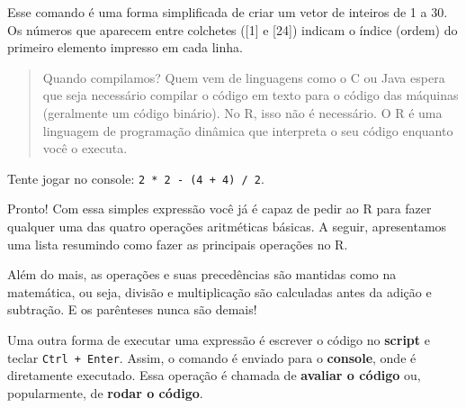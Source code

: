 \documentclass[]{book}
\newenvironment{Shaded}{\begin{snugshade}}{\end{snugshade}}
\newcommand{\CommentTok}[1]{\textcolor[rgb]{0.56,0.35,0.01}{\textit{#1}}}
\newcommand{\DecValTok}[1]{\textcolor[rgb]{0.00,0.00,0.81}{#1}}
\newcommand{\OperatorTok}[1]{\textcolor[rgb]{0.81,0.36,0.00}{\textbf{#1}}}
\newcommand{\StringTok}[1]{\textcolor[rgb]{0.31,0.60,0.02}{#1}}
\begin{document}
Esse comando é uma forma simplificada de criar um vetor de inteiros de 1 a 30.
Os números que aparecem entre colchetes ({[}1{]} e {[}24{]}) indicam o índice (ordem) do primeiro elemento impresso em cada linha.

\begin{quote}
Quando compilamos? Quem vem de linguagens como o C ou Java espera que seja necessário compilar o código em texto para o código das máquinas (geralmente um código binário). No R, isso não é necessário. O R é uma linguagem de programação dinâmica que interpreta o seu código enquanto você o executa.
\end{quote}

Tente jogar no console: \texttt{2\ *\ 2\ -\ (4\ +\ 4)\ /\ 2}.

Pronto! Com essa simples expressão você já é capaz de pedir ao R para fazer qualquer uma das quatro operações aritméticas básicas. A seguir, apresentamos uma lista resumindo como fazer as principais operações no R.

\begin{Shaded}
\end{Shaded}

Além do mais, as operações e suas precedências são mantidas como na matemática, ou seja, divisão e multiplicação são calculadas antes da adição e subtração. E os parênteses nunca são demais!

Uma outra forma de executar uma expressão é escrever o código no \textbf{script} e teclar \texttt{Ctrl\ +\ Enter}. Assim, o comando é enviado para o \textbf{console}, onde é diretamente executado. Essa operação é chamada de \textbf{avaliar o código} ou, popularmente, de \textbf{rodar o código}.
\end{document}
